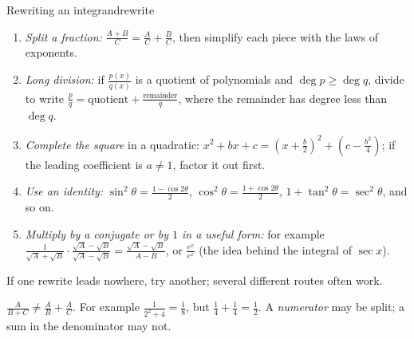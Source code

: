\documentclass[11pt]{article}
\begin{document}
\begin{proc}{Rewriting an integrand}{rewrite}
\begin{enumerate}[nosep]
  \item \emph{Split a fraction:} $\frac{A+B}C=\frac AC+\frac BC$, then simplify each piece with the laws of exponents.
  \item \emph{Long division:} if $\frac{p(x)}{q(x)}$ is a quotient of polynomials and $\deg p\ge\deg q$, divide to write $\frac pq=\text{quotient}+\frac{\text{remainder}}q$, where the remainder has degree less than $\deg q$.
  \item \emph{Complete the square} in a quadratic: $x^2+bx+c=\left(x+\frac b2\right)^2+\left(c-\frac{b^2}4\right)$; if the leading coefficient is $a\ne1$, factor it out first.
  \item \emph{Use an identity:} $\sin^2\theta=\frac{1-\cos2\theta}2$, $\cos^2\theta=\frac{1+\cos2\theta}2$, $1+\tan^2\theta=\sec^2\theta$, and so on.
  \item \emph{Multiply by a conjugate or by $1$ in a useful form:} for example $\frac1{\sqrt A+\sqrt B}\cdot\frac{\sqrt A-\sqrt B}{\sqrt A-\sqrt B}=\frac{\sqrt A-\sqrt B}{A-B}$, or $\frac{e^x}{e^x}$ (the idea behind the integral of $\sec x$).
\end{enumerate}
If one rewrite leads nowhere, try another; several different routes often work.
\end{proc}

\begin{warn}
$\frac{A}{B+C}\ne\frac AB+\frac AC$. For example $\frac1{2^2+4}=\frac18$, but $\frac1{4}+\frac14=\frac12$. A \emph{numerator} may be split; a sum in the denominator may not.
\end{warn}
\end{document}

